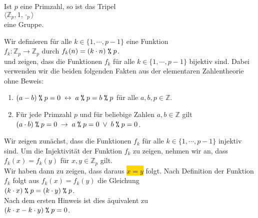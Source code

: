 \begin{Satz}  
Ist $p$ eine Primzahl, so ist das Tripel
\\[0.2cm]
\hspace*{1.3cm}
$\langle \mathbb{Z}_p, 1, \cdot_p \rangle$
\\[0.2cm]
eine Gruppe.
\end{Satz}

\proof
Wir definieren f\"{u}r alle $k \in \{1,\cdots,p-1\}$ eine Funktion
\\[0.2cm]
\hspace*{1.3cm}
$f_k: \mathbb{Z}_p \rightarrow \mathbb{Z}_p$ \quad durch \quad $f_k(n) = (k \cdot n) \;\texttt{\symbol{37}}\;p$.
\\[0.2cm]
und zeigen, dass die Funktionen $f_k$ f\"{u}r alle $k \in \{1, \cdots, p-1\}$ bijektiv sind.
Dabei verwenden wir  die beiden folgenden Fakten aus der elementaren Zahlentheorie ohne Beweis:
\begin{enumerate}
\item $(a-b) \;\texttt{\symbol{37}}\;p = 0 \;\leftrightarrow\; a\;\texttt{\symbol{37}}\;p = b \;\texttt{\symbol{37}}\;p$
      \quad f\"{u}r alle $a,b,p \in \mathbb{Z}$.
\item F\"{u}r jede Primzahl $p$ und f\"{u}r beliebige Zahlen $a,b \in \mathbb{Z}$ gilt
      \\[0.2cm]
      \hspace*{1.3cm}
      $(a \cdot b) \;\texttt{\symbol{37}}\;p = 0 \;\rightarrow\; a \;\texttt{\symbol{37}}\;p = 0 \;\vee\; b \;\texttt{\symbol{37}}\;p = 0$.
      \eoxs
\end{enumerate}
Wir zeigen zun\"{a}chst, dass die Funktionen $f_k$ f\"{u}r alle $k \in \{1, \cdots, p-1\}$ injektiv sind.   
Um die Injektivit\"{a}t der Funktion $f_k$ zu zeigen, nehmen wir an, dass
\\[0.2cm]
\hspace*{1.3cm}
$f_k(x) = f_k(y)$ \quad f\"{u}r $x,y \in \mathbb{Z}_p$ gilt.
\\[0.2cm]
Wir haben dann zu zeigen, dass daraus \colorbox{gold}{$x = y$} folgt.  Nach Definition der Funktion $f_k$ folgt aus
$f_k(x) = f_k(y)$ die Gleichung
\\[0.2cm]
\hspace*{1.3cm}
$(k \cdot x) \;\texttt{\symbol{37}}\;p = (k \cdot y) \;\texttt{\symbol{37}}\;p$.
\\[0.2cm]
Nach dem ersten Hinweis ist dies \"{a}quivalent zu 
\\[0.2cm]
\hspace*{1.3cm}
$(k \cdot x - k \cdot y) \;\texttt{\symbol{37}}\;p = 0$.
